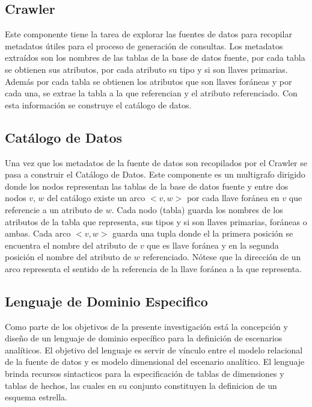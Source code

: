\subsection{Crawler}

Este componente tiene la tarea de explorar las fuentes de datos para recopilar metadatos \'utiles para el proceso de generaci\'on
de consultas. Los metadatos extra\'idos son los nombres de las tablas de la base de datos fuente, por cada tabla se obtienen sus 
atributos, por cada atributo su tipo y si son llaves primarias. Adem\'as por cada tabla se obtienen los atributos que son llaves 
for\'aneas y por cada una, se extrae la tabla a la que referencian y el atributo referenciado. Con esta información se construye 
el catálogo de datos.

\subsection{Catálogo de Datos}

Una vez que los metadatos de la fuente de datos son recopilados por el Crawler se pasa a construir el Catálogo de Datos. Este componente 
es un multigrafo dirigido donde los nodos representan las tablas de la base de datos fuente y entre dos nodos $v$, $w$ 
del catálogo existe un arco $<v,w>$ por cada llave for\'anea en $v$ que referencie a un atributo de $w$. Cada nodo (tabla) guarda 
los nombres de los atributos de la tabla que representa, sus tipos y si son llaves primarias, for\'aneas o ambas. Cada arco $<v,w>$ 
guarda una tupla donde el la primera posici\'on se encuentra el nombre del atributo de $v$ que es llave for\'anea y en la segunda 
posici\'on el nombre del atributo de $w$ referenciado. N\'otese que la direcci\'on de un arco representa el sentido de la 
referencia de la llave for\'anea a la que representa.

\subsection{Lenguaje de Dominio Especifico}

Como parte de los objetivos de la presente investigaci\'on est\'a la concepción y diseño de un lenguaje de dominio 
espec\'ifico para la definici\'on de escenarios analíticos. El objetivo del lenguaje es servir de v\'inculo 
entre el modelo relacional de la fuente de datos y es modelo dimensional del escenario analítico. El lenguaje 
brinda recursos sintacticos para la especificaci\'on de tablas de dimensiones y tablas de hechos, las cuales 
en su conjunto constituyen la definicion de un esquema estrella.

